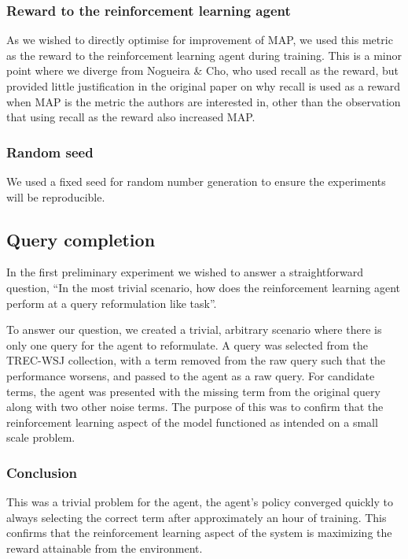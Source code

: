\subsubsection{Reward to the reinforcement learning agent}

As we wished to directly optimise for improvement of MAP, we used this metric as the reward to the reinforcement learning agent during training. This is a minor point where we diverge from Nogueira \& Cho\cite{nogueira2017task}, who used recall as the reward, but provided little justification in the original paper on why recall is used as a reward when MAP is the metric the authors are interested in, other than the observation that using recall as the reward also increased MAP. 

\subsubsection{Random seed}

We used a fixed seed for random number generation to ensure the experiments will be reproducible. 




\subsection{Query completion}
In the first preliminary experiment we wished to answer a straightforward question, ``In the most trivial scenario, how does the reinforcement learning agent perform at a query reformulation like task”. 

To answer our question, we created a trivial, arbitrary scenario where there is only one query for the agent to reformulate. A query was selected from the TREC-WSJ collection, with a term removed from the raw query such that the performance worsens, and passed to the agent as a raw query. For candidate terms, the agent was presented with the missing term from the original query along with two other noise terms. The purpose of this was to confirm that the reinforcement learning aspect of the model functioned as intended on a small scale problem.


\subsubsection{Conclusion}
This was a trivial problem for the agent, the agent’s policy converged quickly to always selecting the correct term after approximately an hour of training. This confirms that the reinforcement learning aspect of the system is maximizing the reward attainable from the environment. 


